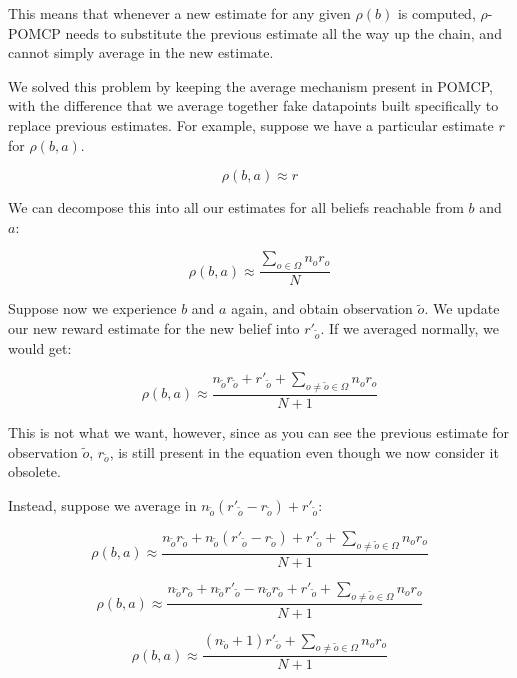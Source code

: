This means that whenever a new estimate for any given $\rho(b)$ is computed, $\rho$-POMCP needs to
substitute the previous estimate all the way up the chain, and cannot simply average in the new
estimate.

We solved this problem by keeping the average mechanism present in POMCP, with the difference that
we average together fake datapoints built specifically to replace previous estimates. For
example, suppose we have a particular estimate $r$ for $\rho(b, a)$.

%

\[ \rho(b,a) \approx r \]

We can decompose this into all our estimates for all beliefs reachable from $b$ and $a$:

\[ \rho(b,a) \approx \frac{\sum_{o\in\Omega} n_o r_o}{N} \]

Suppose now we experience $b$ and $a$ again, and obtain observation $\tilde{o}$. We update our new
reward estimate for the new belief into $r'_{\tilde{o}}$. If we averaged normally, we would get:

\[ \rho(b,a) \approx \frac{ n_{\tilde{o}} r_{\tilde{o}} + r'_{\tilde{o}} +
\sum_{o \neq \tilde{o} \in \Omega} n_o r_o}{N+1} \]

This is not what we want, however, since as you can see the previous estimate for observation
$\tilde{o}$, $r_{\tilde{o}}$, is still present in the equation even though we now consider it
obsolete.

Instead, suppose we average in $n_{\tilde{o}}(r'_{\tilde{o}} - r_{\tilde{o}}) + r'_{\tilde{o}}$:

\[ \rho(b,a) \approx \frac{ n_{\tilde{o}} r_{\tilde{o}} + n_{\tilde{o}}(r'_{\tilde{o}} -
r_{\tilde{o}}) + r'_{\tilde{o}} +
\sum_{o \neq \tilde{o} \in \Omega} n_o r_o}{N+1} \]

\[ \rho(b,a) \approx \frac{ n_{\tilde{o}} r_{\tilde{o}} + n_{\tilde{o}}r'_{\tilde{o}} -
        n_{\tilde{o}} r_{\tilde{o}} + r'_{\tilde{o}} +
\sum_{o \neq \tilde{o} \in \Omega} n_o r_o}{N+1} \]

\[ \rho(b,a) \approx \frac{ ( n_{\tilde{o}}+1) r'_{\tilde{o}} +
\sum_{o \neq \tilde{o} \in \Omega} n_o r_o}{N+1} \]

